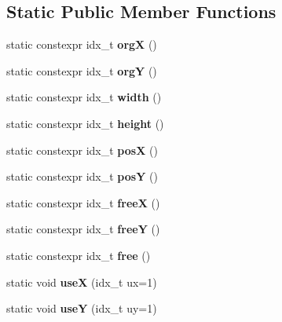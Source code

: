\subsection*{Static Public Member Functions}
\begin{DoxyCompactItemize}
\item 
\mbox{\label{structStaticPanel_a212fd5e5bcdcd315954c142444fe58cd}} 
static constexpr idx\+\_\+t {\bfseries orgX} ()
\item 
\mbox{\label{structStaticPanel_af02d741f125c68e62f4136d113d1d509}} 
static constexpr idx\+\_\+t {\bfseries orgY} ()
\item 
\mbox{\label{structStaticPanel_a282e4e37cb469aa22c941ae601814dfc}} 
static constexpr idx\+\_\+t {\bfseries width} ()
\item 
\mbox{\label{structStaticPanel_a25776cf952e42e10edb36235744d1326}} 
static constexpr idx\+\_\+t {\bfseries height} ()
\item 
\mbox{\label{structStaticPanel_a5f81c3d0f56d0cd0c898cccd7df0af5d}} 
static constexpr idx\+\_\+t {\bfseries posX} ()
\item 
\mbox{\label{structStaticPanel_a9ab23a0b5f4350ca53442bfe18abb83a}} 
static constexpr idx\+\_\+t {\bfseries posY} ()
\item 
\mbox{\label{structStaticPanel_a5f061e3f28cf7ef9b243d010d61f64fe}} 
static constexpr idx\+\_\+t {\bfseries freeX} ()
\item 
\mbox{\label{structStaticPanel_a3c80c3856c529db7e75985a0dc256aba}} 
static constexpr idx\+\_\+t {\bfseries freeY} ()
\item 
\mbox{\label{structStaticPanel_ab079b6885119d57fa9b19fde200f6d08}} 
static constexpr idx\+\_\+t {\bfseries free} ()
\item 
\mbox{\label{structStaticPanel_a543575d0480cce8c0e3e34fbdff5c6b8}} 
static void {\bfseries useX} (idx\+\_\+t ux=1)
\item 
\mbox{\label{structStaticPanel_aa74dc84981d0ae6f1e5c6a8892b5eea0}} 
static void {\bfseries useY} (idx\+\_\+t uy=1)
\end{DoxyCompactItemize}


